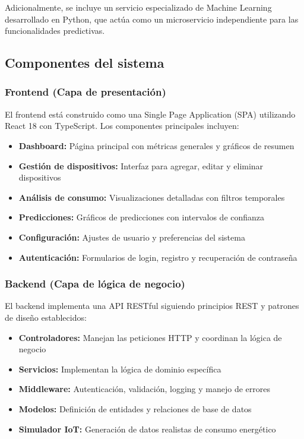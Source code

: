 Adicionalmente, se incluye un servicio especializado de Machine Learning desarrollado en Python, que actúa como un microservicio independiente para las funcionalidades predictivas.

\subsection{Componentes del sistema}

\subsubsection{Frontend (Capa de presentación)}

El frontend está construido como una Single Page Application (SPA) utilizando React 18 con TypeScript. Los componentes principales incluyen:

\begin{itemize}
    \item \textbf{Dashboard:} Página principal con métricas generales y gráficos de resumen
    \item \textbf{Gestión de dispositivos:} Interfaz para agregar, editar y eliminar dispositivos
    \item \textbf{Análisis de consumo:} Visualizaciones detalladas con filtros temporales
    \item \textbf{Predicciones:} Gráficos de predicciones con intervalos de confianza
    \item \textbf{Configuración:} Ajustes de usuario y preferencias del sistema
    \item \textbf{Autenticación:} Formularios de login, registro y recuperación de contraseña
\end{itemize}

\subsubsection{Backend (Capa de lógica de negocio)}

El backend implementa una API RESTful siguiendo principios REST y patrones de diseño establecidos:

\begin{itemize}
    \item \textbf{Controladores:} Manejan las peticiones HTTP y coordinan la lógica de negocio
    \item \textbf{Servicios:} Implementan la lógica de dominio específica
    \item \textbf{Middleware:} Autenticación, validación, logging y manejo de errores
    \item \textbf{Modelos:} Definición de entidades y relaciones de base de datos
    \item \textbf{Simulador IoT:} Generación de datos realistas de consumo energético
\end{itemize}

